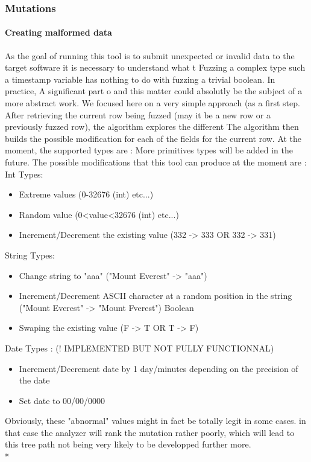 \documentclass{article}
\begin{document}
  				
			\subsubsection{Mutations}
				\paragraph{Creating malformed data} 
As the goal of running this tool is to submit unexpected or invalid data to the target software it is necessary to understand what t
Fuzzing a complex type such a timestamp variable has nothing to do with fuzzing a trivial boolean. In practice, A significant part o
and this matter could absolutly be the subject of a more abstract work. We focused here on a very simple approach (as a first step.
After retrieving the current row being fuzzed (may it be a new row or a previously fuzzed row), the algorithm explores the different
The algorithm then builds the possible modification for each of the fields for the current row.
At the moment, the supported types are : %
More primitives types will be added in the future.
The possible modifications that this tool can produce at the moment are : %
				Int Types:
				\begin{itemize}
		
					\item Extreme values (0-32676 (int) etc...)
					\item Random value (0<value<32676 (int) etc...)
					\item Increment/Decrement the existing value (332 -> 333 OR 332 -> 331)
				\end{itemize}
				String Types:
				\begin{itemize}
			
					\item Change string to "aaa" ("Mount Everest" -> "aaa")
					\item Increment/Decrement ASCII character at a random position in the string ("Mount Everest" -> "Mount Fverest")
					Boolean
					\item Swaping the existing value (F -> T OR T -> F)
					\end{itemize}
					Date Types : (! IMPLEMENTED BUT NOT FULLY FUNCTIONNAL)					
					\begin{itemize}
					\item Increment/Decrement date by 1 day/minutes depending on the precision of the date
					\item Set date to 00/00/0000
				\end{itemize}
Obviously, these "abnormal" values might in fact be totally legit in some cases. in that case the analyzer 
will rank the mutation rather poorly, which will lead to this tree path not being very likely to be developped further more.
				\\*
\end{document}
